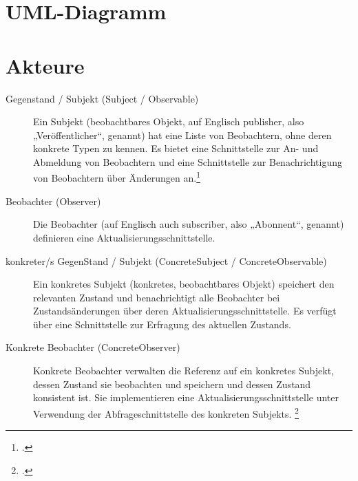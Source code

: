 \documentclass{lehramt-informatik}
\begin{document}
%

\section{UML-Diagramm}


%

\section{Akteure}

\begin{description}
\item[Gegenstand / Subjekt (Subject / Observable)]

Ein Subjekt (beobachtbares Objekt, auf Englisch publisher, also
„Veröffentlicher“, genannt) hat eine Liste von Beobachtern, ohne deren
konkrete Typen zu kennen. Es bietet eine Schnittstelle zur An- und
Abmeldung von Beobachtern und eine Schnittstelle zur Benachrichtigung
von Beobachtern über Änderungen an.\footcite[Seite 251]{gof}

\item[Beobachter (Observer)]
Die Beobachter (auf Englisch auch subscriber, also „Abonnent“, genannt)
definieren eine Aktualisierungsschnittstelle.

\item[konkreter/s GegenStand / Subjekt (ConcreteSubject / ConcreteObservable)]

Ein konkretes Subjekt (konkretes, beobachtbares Objekt) speichert den
relevanten Zustand und benachrichtigt alle Beobachter bei
Zustandsänderungen über deren Aktualisierungsschnittstelle. Es verfügt
über eine Schnittstelle zur Erfragung des aktuellen Zustands.

\item[Konkrete Beobachter (ConcreteObserver)]

Konkrete Beobachter verwalten die Referenz auf ein konkretes Subjekt,
dessen Zustand sie beobachten und speichern und dessen Zustand
konsistent ist. Sie implementieren eine Aktualisierungsschnittstelle
unter Verwendung der Abfrageschnittstelle des konkreten Subjekts.
\footcite{wiki:beobachter}
\end{description}
\end{document}
